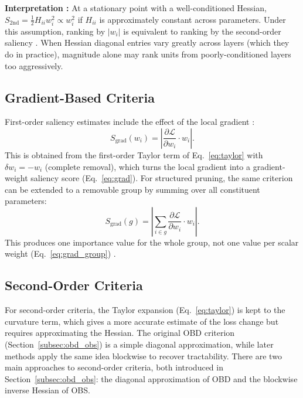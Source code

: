 \textbf{Interpretation : } At a stationary point with a well-conditioned
Hessian, $S_{\mathrm{2nd}} = \tfrac{1}{2} H_{ii} w_i^2 \propto w_i^2$ if
$H_{ii}$ is approximately constant across parameters.  Under this assumption,
ranking by $|w_i|$ is equivalent to ranking by the second-order saliency \cite{lecun1989optimal}.
When Hessian diagonal entries vary greatly across layers (which they do in
practice), magnitude alone may rank units from poorly-conditioned layers too
aggressively.

\subsection{Gradient-Based Criteria}
\label{subsec:gradient_based_criteria}

First-order saliency estimates include the effect of the local gradient \cite{molchanov2017variational}:
\begin{equation}
	S_{\mathrm{grad}}(w_i)
	= \left|\frac{\partial\mathcal{L}}{\partial w_i}\cdot w_i\right|.
	\label{eq:grad}
\end{equation}
This is obtained from the first-order Taylor term of Eq.~\eqref{eq:taylor} with $\delta w_i = -w_i$
(complete removal), which turns the local gradient into a gradient-weight saliency score (Eq.~\eqref{eq:grad}). For structured pruning, the same criterion can be
extended to a removable group by summing over all constituent parameters:
\begin{equation}
	S_{\mathrm{grad}}(g)
	= \left|\sum_{i \in g}\frac{\partial\mathcal{L}}{\partial w_i}\cdot w_i\right|.
	\label{eq:grad_group}
\end{equation}
This produces one importance value for the whole group, not one value per scalar weight (Eq.~\eqref{eq:grad_group}) \cite{molchanov2017variational}.

\subsection{Second-Order Criteria}
\label{subsec:second_order_criteria}
For second-order criteria, the Taylor expansion (Eq.~\eqref{eq:taylor}) is kept to the curvature term, which gives a more accurate estimate of the loss change but requires approximating the Hessian. The original OBD criterion (Section~\ref{subsec:obd_obs}) is a simple diagonal approximation, while later methods apply the same idea blockwise to recover tractability.
There are two main approaches to second-order criteria, both introduced in Section~\ref{subsec:obd_obs}: the diagonal approximation of OBD and the blockwise inverse Hessian of OBS.

